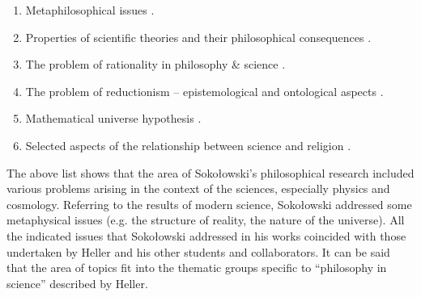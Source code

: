\begin{enumerate}

\item Metaphilosophical issues 
\parencites[numerous remarks in:][]{}[][]{}[][]{}[][]{}[][]{}.%


\item Properties of scientific theories and their philosophical consequences 
\parencites[][]{}[][]{}[][]{}[][]{}[][]{}[][]{}[][]{}[][]{}[][]{}[][]{}[][]{}[][]{}[][]{}.%


\item The problem of rationality in philosophy \& science 
\parencites[][]{}[][]{}.%


\item The problem of reductionism -- epistemological and ontological aspects 
\parencites[][]{}[][]{}[][]{}.%


\item Mathematical universe hypothesis 
\parencites[][]{}[][]{}[][]{}[][]{}.%


\item Selected aspects of the relationship between science and religion 
\parencites[][]{}[][]{}[][]{}[][]{}[][]{}.%


\end{enumerate}

The above list shows that the area of Sokołowski's philosophical research included various problems arising in the context of the sciences, especially physics and cosmology. Referring to the results of modern science, Sokołowski addressed some metaphysical issues (e.g. the structure of reality, the nature of the universe). All the indicated issues that Sokołowski addressed in his works coincided with those undertaken by Heller and his other students and collaborators. It can be said that the area of topics fit into the thematic groups specific to ``philosophy in science'' described by Heller.




